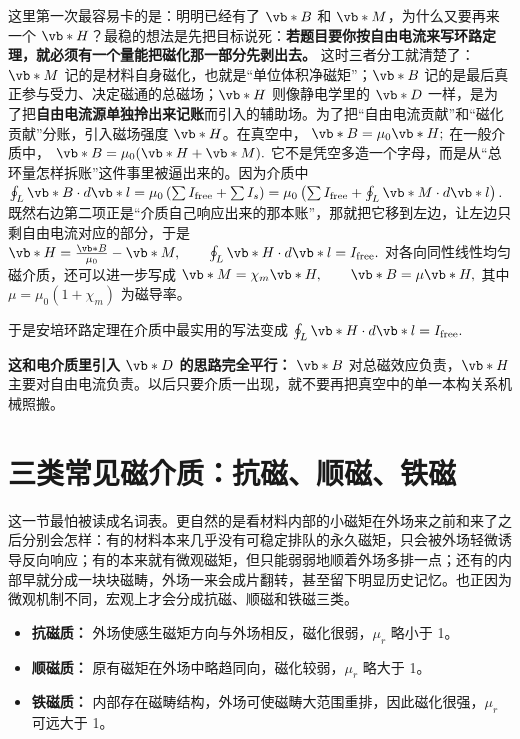 \documentclass[lang=cn,11pt]{elegantbook}
\newcommand{\bridge}[1]{\begin{note}#1\end{note}}
\begin{document}
这里第一次最容易卡的是：明明已经有了 \(\vb*{B}\) 和 \(\vb*{M}\)，为什么又要再来一个 \(\vb*{H}\)？最稳的想法是先把目标说死：\textbf{若题目要你按自由电流来写环路定理，就必须有一个量能把磁化那一部分先剥出去。} 这时三者分工就清楚了：\(\vb*{M}\) 记的是材料自身磁化，也就是“单位体积净磁矩”；\(\vb*{B}\) 记的是最后真正参与受力、决定磁通的总磁场；\(\vb*{H}\) 则像静电学里的 \(\vb*{D}\) 一样，是为了把\textbf{自由电流源单独拎出来记账}而引入的辅助场。为了把“自由电流贡献”和“磁化贡献”分账，引入磁场强度 \(\vb*{H}\)。在真空中，
 \(\vb*{B}=\mu_0\vb*{H};\) 
在一般介质中，
 \(\vb*{B}=\mu_0(\vb*{H}+\vb*{M}).\) 
它不是凭空多造一个字母，而是从“总环量怎样拆账”这件事里被逼出来的。因为介质中
 \(\oint_L \vb*{B}\cdot d\vb*{l} =\mu_0\left(\sum I_{\mathrm{free}}+\sum I_s\right) =\mu_0\left(\sum I_{\mathrm{free}}+\oint_L \vb*{M}\cdot d\vb*{l}\right).\) 
既然右边第二项正是“介质自己响应出来的那本账”，那就把它移到左边，让左边只剩自由电流对应的部分，于是
 \(\vb*{H}=\frac{\vb*{B}}{\mu_0}-\vb*{M}, \qquad \oint_L \vb*{H}\cdot d\vb*{l}=I_{\mathrm{free}}.\) 
对各向同性线性均匀磁介质，还可以进一步写成
 \(\vb*{M}=\chi_m \vb*{H}, \qquad \vb*{B}=\mu\vb*{H},\) 
其中 \(\mu=\mu_0(1+\chi_m)\) 为磁导率。

于是安培环路定理在介质中最实用的写法变成
 \(\oint_L \vb*{H}\cdot d\vb*{l}=I_{\mathrm{free}}.\) 

\begin{note}
\textbf{这和电介质里引入 \(\vb*{D}\) 的思路完全平行：} \(\vb*{B}\) 对总磁效应负责，\(\vb*{H}\) 主要对自由电流负责。以后只要介质一出现，就不要再把真空中的单一本构关系机械照搬。
\end{note}

\section{三类常见磁介质：抗磁、顺磁、铁磁}

\bridge{这一节最怕被读成名词表。更自然的是看材料内部的小磁矩在外场来之前和来了之后分别会怎样：有的材料本来几乎没有可稳定排队的永久磁矩，只会被外场轻微诱导反向响应；有的本来就有微观磁矩，但只能弱弱地顺着外场多排一点；还有的内部早就分成一块块磁畴，外场一来会成片翻转，甚至留下明显历史记忆。也正因为微观机制不同，宏观上才会分成抗磁、顺磁和铁磁三类。}

\begin{itemize}
 \item \textbf{抗磁质：} 外场使感生磁矩方向与外场相反，磁化很弱，\(\mu_r\) 略小于 1。
 \item \textbf{顺磁质：} 原有磁矩在外场中略趋同向，磁化较弱，\(\mu_r\) 略大于 1。
 \item \textbf{铁磁质：} 内部存在磁畴结构，外场可使磁畴大范围重排，因此磁化很强，\(\mu_r\) 可远大于 1。
\end{itemize}
\end{document}
